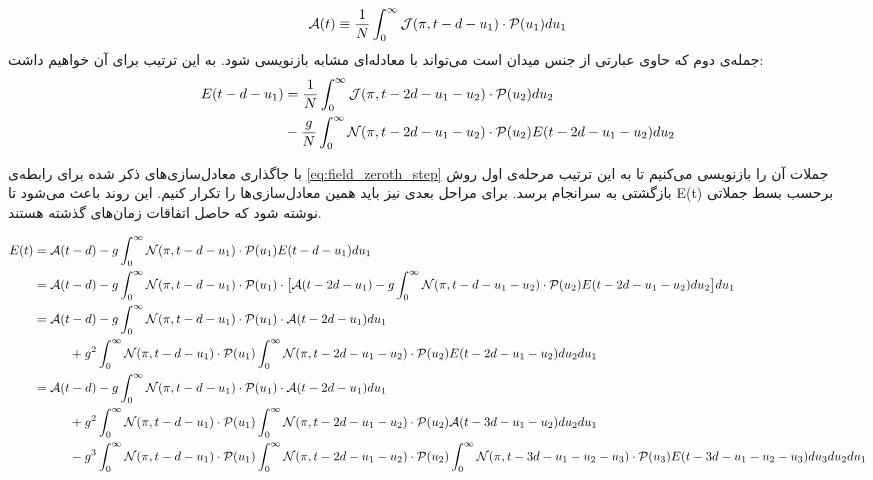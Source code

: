 \begin{equation}
	\mathcal{A}(t) \equiv \frac{1}{N}\int_{0}^{\infty} \mathcal{J}(\pi,t-d-u_1) \cdot \mathcal{P}(u_{1}) du_1
\end{equation}
 جمله‌ی دوم که حاوی عبارتی از جنس میدان است می‌تواند با معادله‌ای مشابه بازنویسی شود. به این ترتیب برای آن خواهیم داشت:
\begin{align}
	E(t - d - u_1) &= \frac{1}{N} \int_{0}^{\infty} \mathcal{J}(\pi,t-2d-u_1-u_2) \cdot \mathcal{P}(u_{2}) du_2\\
	&- \frac{g}{N}\int_{0}^{\infty} \mathcal{N}(\pi, t-2d-u_1-u_2) \cdot \mathcal{P}(u_{2}) E(t-2d-u_1-u_2)  du_2
\end{align}

\begin{landscape}
با جاگذاری معادل‌سازی‌های ذکر شده برای رابطه‌ی
\ref{eq:field_zeroth_step}
جملات آن را بازنویسی می‌کنیم تا به این ترتیب مرحله‌ی اول روش بازگشتی به سرانجام برسد. برای مراحل بعدی نیز باید همین معادل‌سازی‌ها را تکرار کنیم. این روند باعث می‌شود تا 
E(t)
برحسب بسط جملاتی نوشته شود که حاصل اتفاقات زمان‌های گذشته هستند.

	\begin{align}
		E(t) &= \mathcal{A}(t-d) - g\int_{0}^{\infty} \mathcal{N}(\pi, t-d-u_1) \cdot \mathcal{P}(u_{1}) E(t-d-u_1) du_1\\
		&= \mathcal{A}(t-d) - g\int_{0}^{\infty} \mathcal{N}(\pi, t-d-u_1) \cdot \mathcal{P}(u_{1}) \cdot \big[ \mathcal{A}(t-2d-u_1) - g\int_{0}^{\infty} \mathcal{N}(\pi, t-d- u_1-u_2) \cdot \mathcal{P}(u_{2}) E(t-2d-u_1-u_2) du_2 \big] du_1\\
		&= \mathcal{A}(t-d) - g\int_{0}^{\infty} \mathcal{N}(\pi, t-d-u_1) \cdot \mathcal{P}(u_{1}) \cdot \mathcal{A}(t-2d-u_1) du_1\\ 
		&\hspace{1 cm}+ g^2 \int_{0}^{\infty} \mathcal{N}(\pi, t-d-u_1) \cdot \mathcal{P}(u_{1})\int_{0}^{\infty} \mathcal{N}(\pi, t-2d-u_1-u_2) \cdot \mathcal{P}(u_{2}) E(t-2d-u_1-u_2) du_2 du_1\\
		&= \mathcal{A}(t-d) - g\int_{0}^{\infty} \mathcal{N}(\pi, t-d-u_1) \cdot \mathcal{P}(u_{1}) \cdot \mathcal{A}(t-2d-u_1) du_1\\ 
		&\hspace{1 cm}+ g^2 \int_{0}^{\infty} \mathcal{N}(\pi, t-d-u_1) \cdot \mathcal{P}(u_{1})\int_{0}^{\infty} \mathcal{N}(\pi, t-2d-u_1-u_2) \cdot \mathcal{P}(u_{2}) \mathcal{A}(t-3d-u_1-u_2) du_2 du_1\\
		&\hspace{1 cm}- g^3 \int_{0}^{\infty} \mathcal{N}(\pi, t-d-u_1) \cdot \mathcal{P}(u_{1})\int_{0}^{\infty} \mathcal{N}(\pi, t-2d-u_1-u_2) \cdot \mathcal{P}(u_{2}) \int_{0}^{\infty} \mathcal{N}(\pi, t-3d-u_1-u_2-u_3) \cdot \mathcal{P}(u_{3}) E(t-3d-u_1-u_2-u_3) du_3 du_2 du_1
	\end{align}
\end{landscape}

